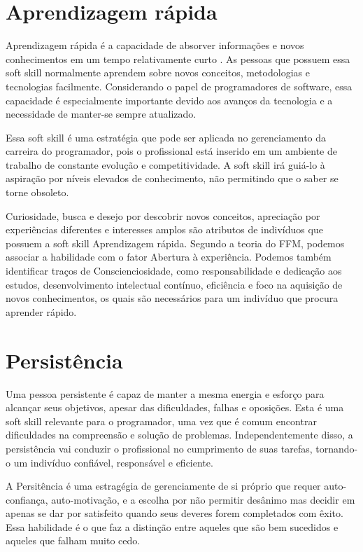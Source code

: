 \section{Aprendizagem rápida}

Aprendizagem rápida é a capacidade de absorver informações e novos conhecimentos em um tempo relativamente curto \cite{ahmed:12}. As pessoas que possuem essa soft skill normalmente aprendem sobre novos conceitos, metodologias e tecnologias facilmente. Considerando o papel de programadores de software, essa capacidade é especialmente importante devido aos avanços da tecnologia e a necessidade de manter-se sempre atualizado.

Essa soft skill é uma estratégia que pode ser aplicada no gerenciamento da carreira do programador, pois o profissional está inserido em um  ambiente de trabalho de constante evolução e competitividade. A soft skill irá guiá-lo à aspiração por níveis elevados de conhecimento, não permitindo que o saber se torne obsoleto. 

Curiosidade, busca e desejo por descobrir novos conceitos, apreciação por experiências diferentes e interesses amplos são atributos de indivíduos que possuem a soft skill Aprendizagem rápida. Segundo a teoria do FFM, podemos associar a habilidade com o fator Abertura à experiência.
Podemos também identificar traços de Conscienciosidade, como responsabilidade e dedicação aos estudos, desenvolvimento intelectual contínuo, eficiência e foco na aquisição de novos conhecimentos, os quais são necessários para um indivíduo que procura aprender rápido.

\section{Persistência}

Uma pessoa persistente é capaz de manter a mesma energia e esforço para alcançar seus objetivos, apesar das dificuldades, falhas e oposições. Esta é uma soft skill relevante para o programador, uma vez que é comum encontrar dificuldades na compreensão e solução de problemas. Independentemente disso, a persistência vai conduzir o profissional no cumprimento de suas tarefas, tornando-o um indivíduo confiável, responsável e  eficiente.

A Persitência é uma estragégia de gerenciamente de si próprio que requer auto-confiança, auto-motivação, e a escolha por não permitir desânimo mas decidir em apenas se dar por satisfeito  quando seus deveres forem completados com êxito. Essa habilidade é o que faz a distinção entre aqueles que são bem sucedidos e aqueles que falham muito cedo.

